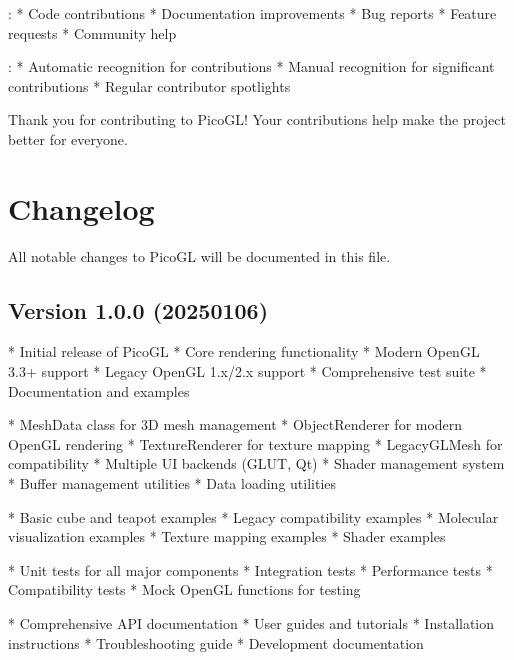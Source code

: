 \documentclass[a4paper,10pt,english,openany,oneside]{sphinxmanual}
\begin{document}
\sphinxAtStartPar
{}:
* Code contributions
* Documentation improvements
* Bug reports
* Feature requests
* Community help

\sphinxAtStartPar
{}:
* Automatic recognition for contributions
* Manual recognition for significant contributions
* Regular contributor spotlights

\sphinxAtStartPar
Thank you for contributing to PicoGL! Your contributions help make the project better for everyone.

\sphinxstepscope


\section{Changelog}
\label{\detokenize{changelog:changelog}}\label{\detokenize{changelog::doc}}
\sphinxAtStartPar
All notable changes to PicoGL will be documented in this file.


\subsection{Version 1.0.0 (2025\sphinxhyphen{}01\sphinxhyphen{}06)}
\label{\detokenize{changelog:version-1-0-0-2025-01-06}}
\sphinxAtStartPar
{}
* Initial release of PicoGL
* Core rendering functionality
* Modern OpenGL 3.3+ support
* Legacy OpenGL 1.x/2.x support
* Comprehensive test suite
* Documentation and examples

\sphinxAtStartPar
{}
* MeshData class for 3D mesh management
* ObjectRenderer for modern OpenGL rendering
* TextureRenderer for texture mapping
* LegacyGLMesh for compatibility
* Multiple UI backends (GLUT, Qt)
* Shader management system
* Buffer management utilities
* Data loading utilities

\sphinxAtStartPar
{}
* Basic cube and teapot examples
* Legacy compatibility examples
* Molecular visualization examples
* Texture mapping examples
* Shader examples

\sphinxAtStartPar
{}
* Unit tests for all major components
* Integration tests
* Performance tests
* Compatibility tests
* Mock OpenGL functions for testing

\sphinxAtStartPar
{}
* Comprehensive API documentation
* User guides and tutorials
* Installation instructions
* Troubleshooting guide
* Development documentation
\end{document}
